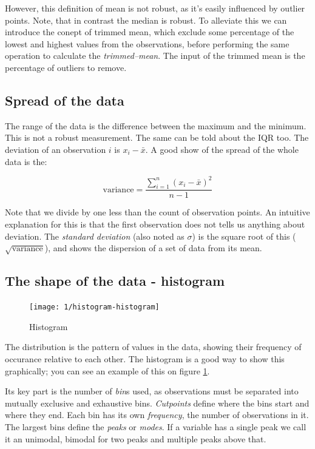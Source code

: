 However, this definition of mean is not robust, as it's easily influenced by
outlier points. Note, that in contrast the median is robust. To alleviate this
we can introduce the conept of trimmed mean, which exclude some percentage of
the lowest and highest values from the observations, before performing the same
operation to calculate the \emph{trimmed--mean}. The input of the trimmed mean
is the percentage of outliers to remove. 

\subsection{Spread of the data}

The range of the data is the difference between the maximum and the minimum.
This is not a robust measurement. The same can be told about the IQR too. The
deviation of an observation $i$ is $x_i - \bar{x}$. A good show of the spread of
the whole data is the:

\[ \mbox{variance} = \frac{\sum_{i=1}^{n}\left(x_i - \bar{x} \right)^2}{n-1}
\]

Note that we divide by one less than the count of observation points. An
intuitive explanation for this is that the first observation does not tells us
anything about deviation. The \emph{standard deviation} (also noted as $\sigma$)
is the square root of this ($\sqrt{\mbox{variance}}$), and shows the dispersion of a set of data from
its mean.

\subsection{The shape of the data - histogram}

\begin{figure}[htbp]
\label{fig:histogram}
\caption{Histogram}
\texttt{[image: 1/histogram-histogram]}
\end{figure}

The distribution is the pattern of values in the data, showing their frequency
of occurance relative to each other. The histogram is a good way to show this
graphically; you can see an example of this on figure \ref{fig:histogram}.

Its key part is the number of \emph{bin}s used, as observations must be
separated into mutually exclusive and exhaustive bins. \emph{Cutpoints} define
where the bins start and where they end. Each bin has its own \emph{frequency},
the number of observations in it. The largest bins define the \emph{peaks} or 
\emph{modes}. If a variable has a single peak we call it an unimodal, bimodal
for two peaks and multiple peaks above that.

